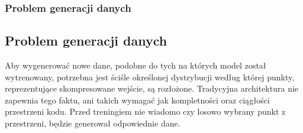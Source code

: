 \documentclass{beamer}
\begin{document}
	\begin{frame}
		\frametitle{Problem generacji danych}
		\subsection{Problem generacji danych}
		Aby wygenerować nowe dane, podobne do tych na których model został wytrenowany, potrzebna jest ściśle określonej dystrybucji według której punkty, reprezentujące skompresowane wejście, są rozłożone. Tradycyjna architektura nie zapewnia tego faktu, ani takich wymagać jak kompletności oraz ciągłości przestrzeni kodu. Przed treningiem nie wiadomo czy losowo wybrany punkt z przestrzeni, będzie generował odpowiednie dane.
	\end{frame}

		
\end{document}
